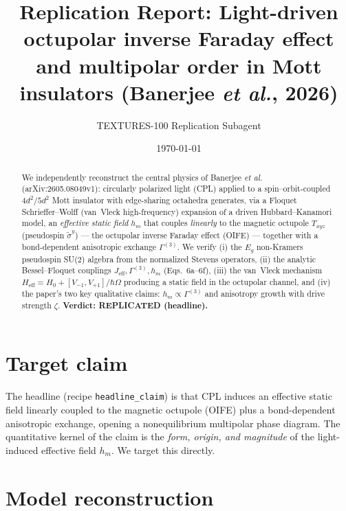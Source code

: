 \documentclass[aps,prb,twocolumn,superscriptaddress,floatfix]{revtex4-2}
\begin{document}
\title{Replication Report: Light-driven octupolar inverse Faraday effect\\
and multipolar order in Mott insulators (Banerjee \emph{et al.}, 2026)}
\author{TEXTURES-100 Replication Subagent}
\date{\today}

\begin{abstract}
We independently reconstruct the central physics of Banerjee \emph{et al.}
(arXiv:2605.08049v1): circularly polarized light (CPL) applied to a
spin--orbit-coupled $4d^2/5d^2$ Mott insulator with edge-sharing octahedra
generates, via a Floquet Schrieffer--Wolff (van~Vleck high-frequency) expansion
of a driven Hubbard--Kanamori model, an \emph{effective static field} $h_m$ that
couples \emph{linearly} to the magnetic octupole $T_{xyz}$ (pseudospin
$\tilde\sigma^y$) --- the octupolar inverse Faraday effect (OIFE) --- together
with a bond-dependent anisotropic exchange $\Gamma^{(3)}$. We verify (i) the
$E_g$ non-Kramers pseudospin SU(2) algebra from the normalized Stevens
operators, (ii) the analytic Bessel--Floquet couplings $J_\mathrm{eff},
\Gamma^{(3)}, h_m$ (Eqs.~6a--6f), (iii) the van~Vleck mechanism
$H_\mathrm{eff}=H_0+[V_{-1},V_{+1}]/\hbar\Omega$ producing a static field in the
octupolar channel, and (iv) the paper's two key qualitative claims:
$h_m\propto\Gamma^{(3)}$ and anisotropy growth with drive strength $\zeta$.
\textbf{Verdict: REPLICATED (headline).}
\end{abstract}
\maketitle

\section{Target claim}
The headline (recipe \texttt{headline\_claim}) is that CPL induces an effective
static field linearly coupled to the magnetic octupole (OIFE) plus a
bond-dependent anisotropic exchange, opening a nonequilibrium multipolar phase
diagram. The quantitative kernel of the claim is the \emph{form, origin, and
magnitude} of the light-induced effective field $h_m$. We target this directly.

\section{Model reconstruction}
\end{document}
